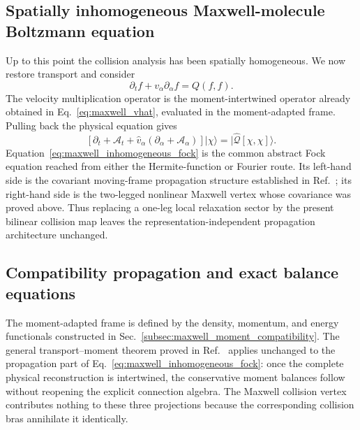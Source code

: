 \documentclass[11pt,oneside]{article}
\numberwithin{equation}{section}
\theoremstyle{definition}
\begin{document}
\subsection{Spatially inhomogeneous Maxwell-molecule Boltzmann equation}
\label{subsec:maxwell_inhomogeneous}

Up to this point the collision analysis has been spatially homogeneous.  We now restore transport and consider
\begin{equation}
\partial_t f+v_\alpha\partial_\alpha f=Q(f,f).
\label{eq:maxwell_inhomogeneous_physical}
\end{equation}
The velocity multiplication operator is the moment-intertwined operator already obtained in Eq.~\eqref{eq:maxwell_vhat}, evaluated in the moment-adapted frame.  Pulling back the physical equation gives
\begin{equation}
\boxed{
\left[
\partial_t+\mathcal A_t+
\widehat v_\alpha(\partial_\alpha+\mathcal A_\alpha)
\right]|\chi\rangle
=
|\widehat{\mathcal Q}[\chi,\chi]\rangle.
}
\label{eq:maxwell_inhomogeneous_fock}
\end{equation}
Equation~\eqref{eq:maxwell_inhomogeneous_fock} is the common abstract Fock equation reached from either the Hermite-function or Fourier route.  Its left-hand side is the covariant moving-frame propagation structure established in Ref.~\cite{Karlin2026LFHFock}; its right-hand side is the two-legged nonlinear Maxwell vertex whose covariance was proved above.  Thus replacing a one-leg local relaxation sector by the present bilinear collision map leaves the representation-independent propagation architecture unchanged.

\subsection{Compatibility propagation and exact balance equations}
\label{subsec:maxwell_compatibility_propagation}

The moment-adapted frame is defined by the density, momentum, and energy functionals constructed in Sec.~\ref{subsec:maxwell_moment_compatibility}.  The general transport--moment theorem proved in Ref.~\cite{Karlin2026LFHFock} applies unchanged to the propagation part of Eq.~\eqref{eq:maxwell_inhomogeneous_fock}: once the complete physical reconstruction is intertwined, the conservative moment balances follow without reopening the explicit connection algebra.  The Maxwell collision vertex contributes nothing to these three projections because the corresponding collision bras annihilate it identically.
\end{document}
